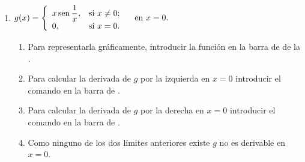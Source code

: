 \begin{enumerate}[leftmargin=*]
\begin{enumerate}
      \item $g(x)=\left\{
            \begin{array}{ll}
            x \operatorname{sen}\dfrac{1}{x}, & \hbox{si $x\neq 0$;} \\
            0,                  & \hbox{si $x=0$.}     \\
            \end{array}
            \right. \quad \textrm{en $x=0$.}$

            \begin{indication}
            \begin{enumerate}
            \item Para representarla gráficamente, introducir la función  en la barra de  de la .
            \item Para calcular la derivada de $g$ por la izquierda en $x=0$ introducir el comando  en la barra de .
            \item Para calcular la derivada de $g$ por la derecha en $x=0$ introducir el comando  en la barra de .
            \item Como ninguno de los dos límites anteriores existe $g$ no es derivable en $x=0$.
            \end{enumerate}
            \end{indication}
      \end{enumerate}



\end{enumerate}
